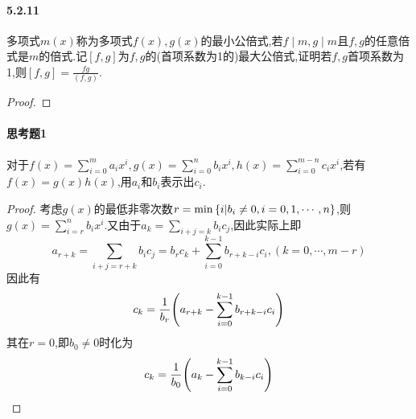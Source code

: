 \documentclass[11pt]{article}
\begin{document}
\paragraph{5.2.11}多项式$m(x)$称为多项式$f(x),g(x)$的最小公倍式,若$f\mid m, g\mid m$且$f,g$的任意倍式是$m$的倍式.记$[f,g]$为$f,g$的(首项系数为1的)最大公倍式,证明若$f,g$首项系数为1,则$[f,g]=\frac{fg}{(f,g)}$.
\begin{proof}
    
\end{proof}

\paragraph{思考题1}对于$f(x)=\sum_{i=0}^{m}a_ix^i, g(x)=\sum_{i=0}^{n}b_ix^i, h(x)=\sum_{i=0}^{m-n}c_ix^i$,若有$f(x)=g(x)h(x)$,用$a_i$和$b_i$表示出$c_i$.
\begin{proof}
    考虑$g(x)$的最低非零次数$r=\min\left\{i|b_i\neq 0, i=0,1,\cdots,n\right\}$,则$g(x)=\sum_{i=r}^{n}b_ix^i$.又由于$a_k=\sum_{i+j=k}b_ic_j$,因此实际上即
    $$a_{r+k}=\sum_{i+j=r+k}b_ic_j=b_rc_k+\sum_{i=0}^{k-1}b_{r+k-i}c_i, (k=0,\cdots,m-r)$$
    因此有
    $$c_k=\frac{1}{b_r}\!\left(a_{r+k}-\sum_{i=0}^{k-1}b_{r+k-i}c_i\right)$$
    其在$r=0$,即$b_0\neq 0$时化为
    $$c_k=\frac{1}{b_0}\!\left(a_{k}-\sum_{i=0}^{k-1}b_{k-i}c_i\right)$$
\end{proof}

\end{document}
